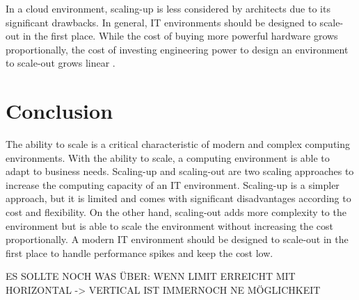 \documentclass{article}
\begin{document}
In a cloud environment, scaling-up is less considered by architects due to its significant drawbacks. In general, IT environments should be designed to scale-out in the first place.  While the cost of buying more powerful hardware grows proportionally, the cost of investing engineering power to design an environment to scale-out grows linear \cite{Abbot2011ScalabilityRules}. 


\section{Conclusion}
The ability to scale is a critical characteristic of modern and complex computing environments. With the ability to scale, a computing environment is able to adapt to business needs. Scaling-up and scaling-out are two scaling approaches to increase the computing capacity of an IT environment. Scaling-up is a simpler approach, but it is limited and comes with significant disadvantages according to cost and flexibility. On the other hand, scaling-out adds more complexity to the environment but is able to scale the environment without increasing the cost proportionally. A modern IT environment should be designed to scale-out in the first place to handle performance spikes and keep the cost low.

ES SOLLTE NOCH WAS ÜBER: WENN LIMIT ERREICHT MIT HORIZONTAL -> VERTICAL IST IMMERNOCH NE MÖGLICHKEIT


\pagebreak


\end{document}
